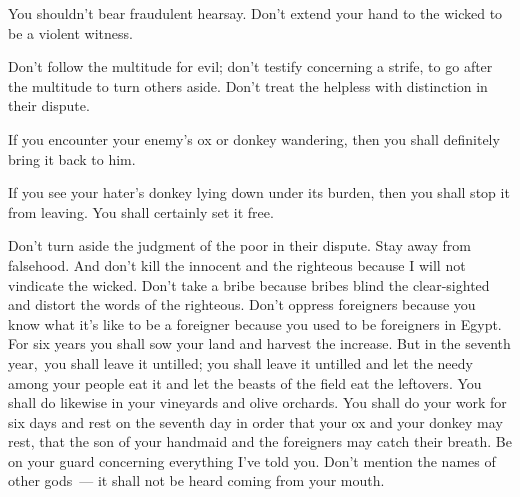 
\begin{inparaenum}
   You shouldn't bear fraudulent hearsay. Don't extend your hand to the wicked to be a violent witness.%

   Don't follow the multitude for evil; don't testify concerning a strife, to go after the multitude to turn others aside.%
   Don't treat the helpless with distinction in their dispute.%

   If you encounter your enemy's ox or donkey wandering, then you shall definitely bring it back to him.%

   If you see your hater's donkey lying down under its burden, then you shall stop it from leaving. You shall certainly set it free.%

   Don't turn aside the judgment of the poor in their dispute.%
   Stay away from falsehood. And don't kill the innocent and the righteous because I will not vindicate the wicked.%
   Don't take a bribe because bribes blind the clear-sighted and distort the words of the righteous.%
   Don't oppress foreigners because you know what it's like to be a foreigner because you used to be foreigners in Egypt.%
   For six years you shall sow your land and harvest the increase.%
   But in the seventh year,\understood{}\ you shall leave it untilled; you shall leave it untilled and let the needy among your people eat it and let the beasts of the field eat the leftovers. You shall do likewise in your vineyards and olive orchards.%
   You shall do your work for six days and rest on the seventh day in order that your ox and your donkey may rest, that the son of your handmaid and the foreigners may catch their breath.%
   Be on your guard concerning everything I've told you. Don't mention the names of other gods~--- it shall not be heard coming from your mouth.%


\end{inparaenum}
